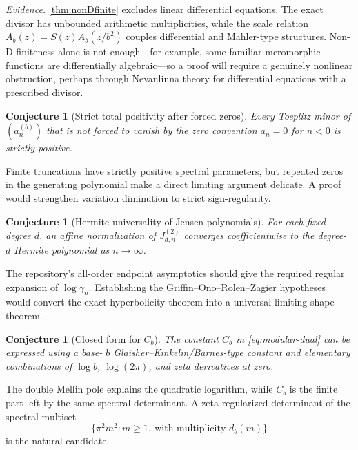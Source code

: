 \documentclass[11pt]{article}
\newtheorem{conjecture}[theorem]{Conjecture}
\theoremstyle{definition}
\theoremstyle{remark}
\begin{document}
\noindent
\emph{Evidence.}  \cref{thm:nonDfinite} excludes linear differential equations.  The exact divisor has unbounded arithmetic multiplicities, while the scale relation
\(A_b(z)=S(z)A_b(z/b^2)\) couples differential and Mahler-type structures.  Non-D-finiteness alone is not enough---for example, some familiar meromorphic functions are differentially algebraic---so a proof will require a genuinely nonlinear obstruction, perhaps through Nevanlinna theory for differential equations with a prescribed divisor.

\begin{conjecture}[Strict total positivity after forced zeros]\label{conj:strictPF}
Every Toeplitz minor of \((a_n^{(b)})\) that is not forced to vanish by the zero convention \(a_n=0\) for \(n<0\) is strictly positive.
\end{conjecture}

\noindent
Finite truncations have strictly positive spectral parameters, but repeated zeros in the generating polynomial make a direct limiting argument delicate.  A proof would strengthen variation diminution to strict sign-regularity.

\begin{conjecture}[Hermite universality of Jensen polynomials]\label{conj:Hermite}
For each fixed degree \(d\), an affine normalization of
\(J_{d,n}^{(2)}\) converges coefficientwise to the degree-
\(d\) Hermite polynomial as \(n\to\infty\).
\end{conjecture}

\noindent
The repository's all-order endpoint asymptotics should give the required regular expansion of
\(\log\gamma_n\).  Establishing the Griffin--Ono--Rolen--Zagier hypotheses \cite{GORZ2019} would convert the exact hyperbolicity theorem into a universal limiting shape theorem.

\begin{conjecture}[Closed form for \(C_b\)]\label{conj:Cb}
The constant \(C_b\) in \eqref{eq:modular-dual} can be expressed using a base-
\(b\) Glaisher--Kinkelin/Barnes-type constant and elementary combinations of
\(\log b\), \(\log(2\pi)\), and zeta derivatives at zero.
\end{conjecture}

\noindent
The double Mellin pole explains the quadratic logarithm, while \(C_b\) is the finite part left by the same spectral determinant.  A zeta-regularized determinant of the spectral multiset
\[
 \bigl\{\pi^2m^2:m\ge1,\ \text{with multiplicity }d_b(m)\bigr\}
\]
is the natural candidate.
\end{document}
